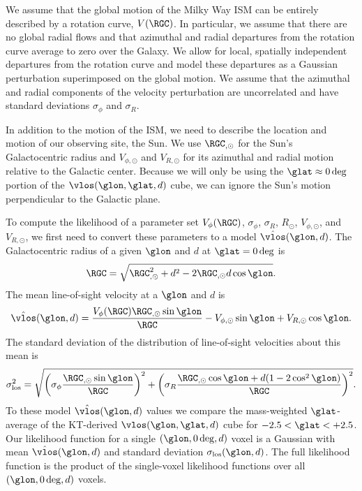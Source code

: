 We assume that the global motion of the Milky Way ISM can be entirely described by a rotation curve, $V(\RGC)$. 
In particular, we assume that there are no global radial flows and that azimuthal and radial departures from the rotation curve average to zero over the Galaxy.
We allow for local, spatially independent departures from the rotation curve and model these departures as a Gaussian perturbation superimposed on the global motion. 
We assume that the azimuthal and radial components of the velocity perturbation are uncorrelated and have standard deviations $\sigma_\phi$ and $\sigma_R$.

In addition to the motion of the ISM, we need to describe the location and motion of our observing site, the Sun. 
We use $\RGC_{, \odot}$ for the Sun's Galactocentric radius and $V_{\phi, \odot}$ and $V_{R, \odot}$ for its azimuthal and radial motion relative to the Galactic center. 
Because we will only be using the $\glat \approx 0 \deg$ portion of the $\vlos(\glon, \glat, d)$ cube, we can ignore the Sun's motion perpendicular to the Galactic plane.

To compute the likelihood of a parameter set $V_\phi (\RGC)$, $\sigma_\phi$, $\sigma_R$, $R_{\odot}$, $V_{\phi, \odot}$, and $V_{R, \odot}$, we first need to convert these parameters to a model $\hat{\vlos}(\glon, d)$. 
The Galactocentric radius of a given $\glon$ and $d$ at $\glat = 0 \deg$ is 
\begin{equation}
\RGC = \sqrt{\RGC^2_{,\odot} + d^2 - 2 \RGC_{, \odot} d \cos \glon}.
\end{equation}
The mean line-of-sight velocity at a $\glon$ and $d$ is
\begin{equation}
\label{eqn:vlos_mean}
\hat{\vlos}(\glon, d) = \frac{V_\phi (\RGC) \RGC_{,\odot} \sin\glon}{\RGC}  - V_{\phi, \odot} \sin \glon + V_{R, \odot} \cos \glon.
\end{equation}
The standard deviation of the distribution of line-of-sight velocities about this mean is 
\begin{equation}
\label{eqn:vlos_var}
\sigma^2_\mathrm{los} = \sqrt{\left(\sigma_\phi \frac{\RGC_{,\odot} \sin \glon}{\RGC} \right)^2 + 
\left(\sigma_R  \frac{\RGC_{,\odot} \cos \glon + d (1 - 2 \cos^2 \glon)}{\RGC} \right)^2}.
\end{equation}
To these model $\hat{\vlos}(\glon, d)$ values we compare the mass-weighted $\glat$-average of the KT-derived $\vlos(\glon, \glat, d)$ cube for $-2.5 < \glat < + 2.5$. 
Our likelihood function for a single $(\glon, 0\deg, d)$ voxel is a Gaussian with mean $\hat{\vlos}(\glon, d)$ and standard deviation $\sigma_\mathrm{los}(\glon, d)$.
The full likelihood function is the product of the single-voxel likelihood functions over all $(\glon, 0\deg, d)$ voxels.

